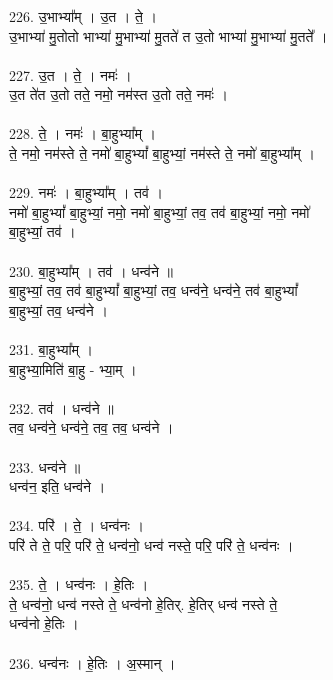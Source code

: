 \subsubsection{}
226. उ॒भाभ्या᳚म् । उ॒त । ते॒ ।\\
उ॒भाभ्या॑ मु॒तोतो भाभ्या॑ मु॒भाभ्या॑ मु॒तते॑ त उ॒तो भाभ्या॑ मु॒भाभ्या॑ मु॒तते᳚ ।\\
\\
227. उ॒त । ते॒ । नमः॑ ।\\
उ॒त ते॑त उ॒तो तते॒ नमो॒ नम॑स्त उ॒तो तते॒ नमः॑ ।\\
\\
228. ते॒ । नमः॑ । बा॒हुभ्या᳚म् ।\\
ते॒ नमो॒ नम॑स्ते ते॒ नमो॑ बा॒हुभ्यां᳚ बा॒हुभ्यां॒ नम॑स्ते ते॒ नमो॑ बा॒हुभ्या᳚म् ।\\
\\
229. नमः॑ । बा॒हुभ्या᳚म् । तव॑ ।\\
नमो॑ बा॒हुभ्यां᳚ बा॒हुभ्यां॒ नमो॒ नमो॑ बा॒हुभ्यां॒ तव॒ तव॑ बा॒हुभ्यां॒ नमो॒ नमो॑\\
बा॒हुभ्यां॒ तव॑ ।\\
\\
230. बा॒हुभ्या᳚म् । तव॑ । धन्व॑ने ॥\\
बा॒हुभ्यां॒ तव॒ तव॑ बा॒हुभ्यां᳚ बा॒हुभ्यां॒ तव॒ धन्व॑ने॒ धन्व॑ने॒ तव॑ बा॒हुभ्यां᳚\\
बा॒हुभ्यां॒ तव॒ धन्व॑ने ।\\
\\
231. बा॒हुभ्या᳚म् ।\\
बा॒हुभ्या॒मिति॑ बा॒हु - भ्या॒म् ।\\
\\
232. तव॑ । धन्व॑ने ॥\\
तव॒ धन्व॑ने॒ धन्व॑ने॒ तव॒ तव॒ धन्व॑ने ।\\
\\
233. धन्व॑ने ॥\\
धन्व॑न॒ इति॒ धन्व॑ने ।\\
\\
234. परि॑ । ते॒ । धन्व॑नः ।\\
परि॑ ते ते॒ परि॒ परि॑ ते॒ धन्व॑नो॒ धन्व॑ नस्ते॒ परि॒ परि॑ ते॒ धन्व॑नः ।\\
\\
235. ते॒ । धन्व॑नः । हे॒तिः ।\\
ते॒ धन्व॑नो॒ धन्व॑ नस्ते ते॒ धन्व॑नो हे॒तिर्. हे॒तिर् धन्व॑ नस्ते ते॒\\
धन्व॑नो हे॒तिः ।\\
\\
236. धन्व॑नः । हे॒तिः । अ॒स्मान् ।\\
